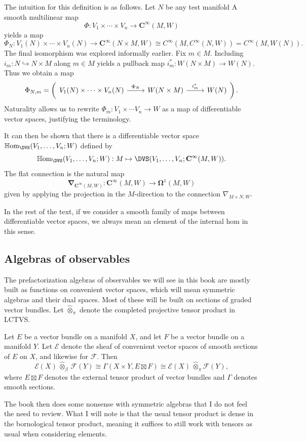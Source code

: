 The intuition for this definition is as follows. Let $N$ be any test manifold A smooth multilinear map
\[
	\Phi : V_1 \times \cdots \times V_n \to \mathbf{C} ^\infty (M,W)
\]
yields a map
\[
	\Phi _N : V_1(N)\times \cdots \times V_n(N) \to \mathbf{C} ^\infty (N\times M,W)\cong C^\infty (M,C^\infty (N,W)) = C^\infty (M,W(N))
.\]
The final isomorphism was explored informally earlier. Fix $m\in M$. Including $i_m : N\hookrightarrow N\times M$ along $m\in M$ yields a pullback map $i^*_m : W(N\times M) \to W(N)$. Thus we obtain a map
\[
	\Phi _{N,m} =
\left(	\begin{tikzcd}[row sep = 2.5em, column sep = 2.5em]
	V_1(N) \times \cdots \times V_n(N) \ar[" \Phi _N ", r]  & W(N\times M)\ar[" i_m^* ", r]  & W(N)
	\end{tikzcd}\right)
.\]
Naturality allows us to rewrite $\Phi _m : V_1 \times \cdots V_n \to W$ as a map of differentiable vector spaces, justifying the terminology.

It can then be shown that there is a differentiable vector space $\mathbb{H} \mathrm{om} _{\DVS } (V_1, \ldots , V_n ; W)$ defined by
\[
	\mathbb{H} \mathrm{om} _{\DVS } (V_1, \ldots , V_n ; W) : M\mapsto \DVS (V_1, \ldots , V_n ; \mathbf{C} ^\infty (M,W))
.\]
The flat connection is the natural map
\[
	\boldsymbol{\nabla }_{\mathbf{C}^\infty (M,W)} : \mathbf{C}^\infty (M,W) \to \boldsymbol{\Omega} ^1(M,W)
\]
given by applying the projection in the $M$-direction to the connection $\nabla _{M\times N,W} $.

In the rest of the text, if we consider a smooth family of maps between differentiable vector spaces, we always mean an element of the internal hom in this sense.

\subsection{Algebras of observables}

The prefactorization algebras of observables we will see in this book are mostly built as functions on convenient vector spaces, which will mean symmetric algebras and their dual spaces. Most of these will be built on sections of graded vector bundles. Let $\widehat{\otimes } _{\pi } $ denote the completed projective tensor product in LCTVS.

\begin{proposition}\label{prp:3-5-22}
	Let $E$ be a vector bundle on a manifold $X$, and let $F$ be a vector bundle on a manifold $Y$. Let $\mathcal{E} $ denote the sheaf of convenient vector spaces of smooth sections of $E$ on $X$, and likewise for $\mathcal{F} $. Then
	\[
		\mathcal{E} (X)\,\widehat{\otimes } _{\beta } \, \mathcal{F} (Y) \cong \Gamma (X\times Y, E\boxtimes F) \cong \mathcal{E} (X)\, \widehat{\otimes } _{\pi } \mathcal{F} (Y),
	\]
	where $E\boxtimes F$ denotes the external tensor product of vector bundles and $\Gamma $ denotes smooth sections.
\end{proposition}

The book then does some nonsense with symmetric algebras that I do not feel the need to review. What I will note is that the usual tensor product is dense in the bornological tensor product, meaning it suffices to still work with tensors as usual when considering elements.
